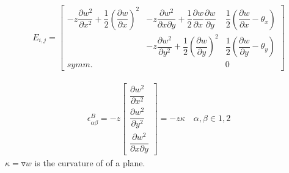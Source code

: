 \documentclass[9pt]{beamer}
\begin{document}
\begin{frame}
\begin{align*}
E_{i,j} =  
\begin{bmatrix}
 -z \dfrac{\partial w^2 }{\partial x^2} + \dfrac{1}{2} \left( \dfrac{\partial w}{\partial x} \right)^2
 & 
 -z \dfrac{\partial w^2 }{\partial x \partial y} + \dfrac{1}{2}  \dfrac{\partial w}{\partial x} \dfrac{\partial w}{\partial y} 
 & 
 \dfrac{1}{2} \left( \dfrac{\partial w}{\partial x}-\theta_x \right)
 \\
 &
 -z \dfrac{\partial w^2 }{\partial y^2} + \dfrac{1}{2} \left( \dfrac{\partial w}{\partial y} \right)^2
 &
  \dfrac{1}{2} \left( \dfrac{\partial w}{\partial y}-\theta_y \right)
  \\
  symm.
  &
  &
  0
\end{bmatrix}
\end{align*}



\begin{align*}
\epsilon_{\alpha \beta}^B = -z
\begin{bmatrix}
\dfrac{\partial w^2 }{\partial x^2}
\\
\dfrac{\partial w^2 }{\partial y^2}
\\
\dfrac{\partial w^2 }{\partial x \partial y}
\end{bmatrix}
=-z \kappa
  \quad  \alpha,\beta\in 1,2
\end{align*}
$\kappa= \mathbf{\triangledown} w$ is the curvature of of a plane.
\end{frame}
\end{document}
